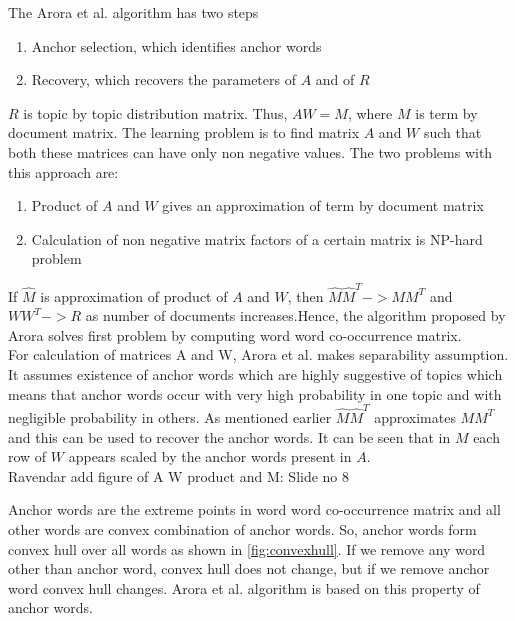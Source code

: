 \documentclass[a4paper,11pt]{article}
\begin{document}
The Arora et al. \cite{tm} algorithm has two steps

\begin{enumerate}
\item Anchor selection, which identifies anchor words
\item Recovery, which recovers the parameters of $A$ and of $R$
\end{enumerate}  

$R$ is topic by topic distribution matrix. Thus, $AW = M$, where $M$ is term by document matrix. The learning problem is to find matrix $A$ and $W$ such that both these matrices can have only non negative values. The two problems with this approach are: \\

\begin{enumerate}
\item Product of $A$ and $W$ gives an approximation of term by document matrix  
\item Calculation of non negative matrix factors of a certain matrix is NP-hard problem
\end{enumerate}

If $\hat{M}$  is approximation of product of $A$ and $W$, then $\hat{M} \hat{M}^T -> M M^T $ and $W W^T -> R$ as number of documents increases.Hence, the algorithm proposed by Arora solves first problem by computing word word co-occurrence matrix. \\

For calculation of matrices A and W, Arora et al. \cite{tm} makes separability assumption. It assumes existence of anchor words which are highly suggestive of topics which means that anchor words occur with very high probability in one topic and with negligible probability in others. As mentioned earlier $\hat{M} \hat{M}^T$ approximates $M M^T $ and this can be used to recover the anchor words. It can be seen that in $M$ each row of $W$ appears scaled by the anchor words present in $A$. \\


{\color{orange} Ravendar add figure of A W product and M: Slide no 8}

Anchor words are the extreme points in word word co-occurrence matrix and all other words are convex combination of anchor words. So, anchor words form convex hull over all words as shown in \ref{fig:convexhull}. If we remove any word other than anchor word, convex hull does not change, but if we remove anchor word convex hull changes. Arora et al. \cite{tm} algorithm is based on this property of anchor words. \\
\end{document}
